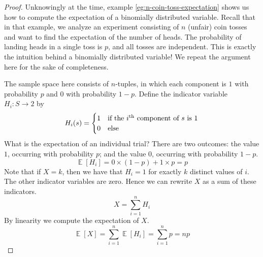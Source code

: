 \documentclass[11pt]{article}
\theoremstyle{definition}
\theoremstyle{remark}
\DeclareMathOperator{\Expect}{\mathbb{E}}
\newcommand{\E}[1]{\Expect{\left[#1\right]}}
\renewcommand{\th}{\textsuperscript{th}}
\begin{document}
\begin{proof}
    Unknowingly at the time, example \ref{eg:n-coin-toss-expectation} shows us
    how to compute the expectation of a binomially distributed variable.
    Recall that in that example, we analyze an experiment consisting of $n$
    (unfair) coin tosses and want to find the expectation of the number of
    heads. The probability of landing heads in a single toss is $p$, and all
    tosses are independent.
    This is exactly the intuition behind a binomially distributed variable!
    We repeat the argument here for the sake of completeness.

    The sample space here consists of $n$-tuples, in which each component is
    $1$ with probability $p$ and $0$ with probability $1-p$.
    Define the indicator variable $H_i : S \to 2$ by
    \begin{equation*}
        H_i(s) = \begin{cases}
            1 & \text{if the $i$\th{} component of $s$ is $1$} \\
            0 & \text{else}
        \end{cases}
    \end{equation*}
    What is the expectation of an individual trial? There are two outcomes: the
    value $1$, occurring with probability $p$; and the value $0$, occurring
    with probability $1-p$.
    \begin{equation*}
        \E{H_i} = 0 \times (1-p) + 1 \times p = p
    \end{equation*}
    Note that if $X = k$, then we have that $H_i = 1$ for exactly $k$ distinct
    values of $i$.
    The other indicator variables are zero.
    Hence we can rewrite $X$ as a sum of these indicators.
    \begin{equation*}
        X = \sum_{i=1}^n H_i
    \end{equation*}
    By linearity we compute the expectation of $X$.
    \begin{equation*}
        \E{X} = \sum_{i=1}^n \E{H_i} = \sum_{i=1}^n p = np
    \end{equation*}


\end{proof}
\end{document}
